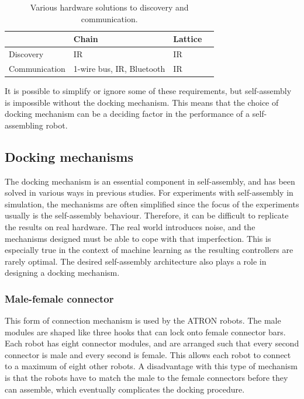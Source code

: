 \begin{table}[H]
	\centering
	\caption{Various hardware solutions to discovery and communication.}
	\begin{tabular}{ | l | l | l |p{5cm} |}
		\hline
		& Chain 						& Lattice \\ \hline
		Discovery 		& IR\cite{castano_conro:_2000}  & IR\cite{gilpin_miche:_2008} \\ \hline
		Communication 	& 1-wire bus\cite{zykov_molecubes:_2007}, IR\cite{castano_conro:_2000}, Bluetooth{\cite{mockel_yamor_2006}} & IR\cite{brandt_atron_2007, gilpin_miche:_2008}  \\\hline
	\end{tabular}
	
	\label{tab:hardware-mechanisms}
\end{table}


It is possible to simplify or ignore some of these requirements, but self-assembly is impossible without the docking mechanism.
This means that the choice of docking mechanism can be a deciding factor in the performance of a self-assembling robot. 


\subsection{Docking mechanisms}
\label{sec:mechanisms}
The docking mechanism is an essential component in self-assembly, and has been solved in various ways in previous studies.
For experiments with self-assembly in simulation, the mechanisms are often simplified since the focus of the experiments usually is the self-assembly behaviour.
Therefore, it can be difficult to replicate the results on real hardware.
The real world introduces noise, and the mechanisms designed must be able to cope with that imperfection.
This is especially true in the context of machine learning as the resulting controllers are rarely optimal.
The desired self-assembly architecture also plays a role in designing a docking mechanism.

\subsubsection*{Male-female connector}
This form of connection mechanism is used by the ATRON\cite{brandt_atron_2007} robots.
The male modules are shaped like three hooks that can lock onto female connector bars.
Each robot has eight connector modules, and are arranged such that every second connector is male and every second is female.
This allows each robot to connect to a maximum of eight other robots.
A disadvantage with this type of mechanism is that the robots have to match the male to the female connectors before they can assemble, which eventually complicates the docking procedure.
